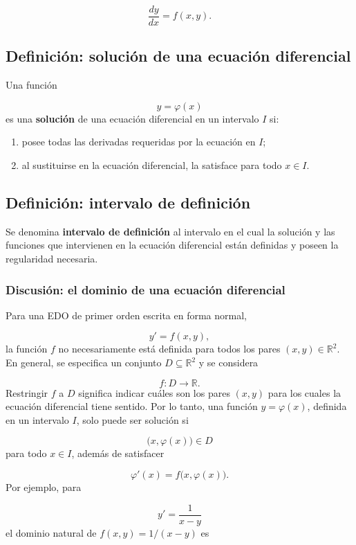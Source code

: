 \documentclass[12pt,a4paper]{article}
\begin{document}
	\[
	\frac{dy}{dx}
	=
	f(x,y).
	\]
	\subsection{Definición: solución de una ecuación diferencial}
	
	Una función
	
	\[
	y=\varphi(x)
	\]
	es una \textbf{solución} de una ecuación diferencial en un intervalo \(I\) si:
	
	\begin{enumerate}[label=\arabic*.]
		\item posee todas las derivadas requeridas por la ecuación en \(I\);
		\item al sustituirse en la ecuación diferencial, la satisface para todo \(x\in I\).
	\end{enumerate}
	
	\subsection{Definición: intervalo de definición}
	
	Se denomina \textbf{intervalo de definición} al intervalo en el cual la solución y las funciones que intervienen en la ecuación diferencial están definidas y poseen la regularidad necesaria.
	
	\subsubsection*{Discusión: el dominio de una ecuación diferencial}
	
	Para una EDO de primer orden escrita en forma normal,
	
	\[
	y'=f(x,y),
	\]
	la función \(f\) no necesariamente está definida para todos los pares \((x,y)\in\mathbb{R}^2\). En general, se especifica un conjunto \(D\subseteq\mathbb{R}^2\) y se considera
	
	\[
	f\colon D\longrightarrow\mathbb{R}.
	\]
	Restringir \(f\) a \(D\) significa indicar cuáles son los pares \((x,y)\) para los cuales la ecuación diferencial tiene sentido. Por lo tanto, una función \(y=\varphi(x)\), definida en un intervalo \(I\), solo puede ser solución si
	
	\[
	\bigl(x,\varphi(x)\bigr)\in D
	\]
	para todo \(x\in I\), además de satisfacer
	
	\[
	\varphi'(x)=f\bigl(x,\varphi(x)\bigr).
	\]
	Por ejemplo, para
	
	\[
	y'=\frac{1}{x-y}
	\]
	el dominio natural de \(f(x,y)=1/(x-y)\) es
	
\end{document}
